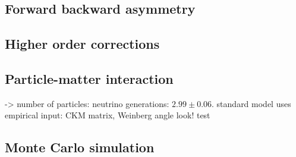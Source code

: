\subsection{Forward backward asymmetry}
\label{sub:forward_backward_asymmetry}

\subsection{Higher order corrections}
\subsection{Particle-matter interaction}
-> number of particles: neutrino generations: $2.99 \pm 0.06$. 
standard model uses empirical input: CKM matrix, Weinberg angle
look!\cite{pdg} test
\subsection{Monte Carlo simulation}
\label{sub:monte_carlo_simulation}



